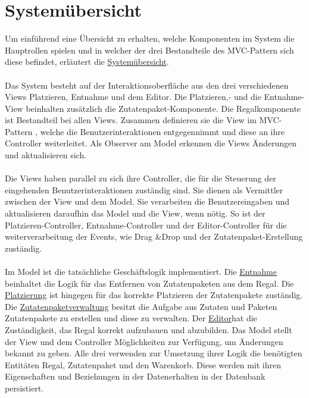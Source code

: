\section{Systemübersicht}
Um einführend eine Übersicht zu erhalten, welche Komponenten im System die Hauptrollen spielen und in welcher der
drei Bestandteile des MVC-Pattern sich diese befindet, erläutert die \hyperref[fig:Systemuebersicht]{Systemübersicht}.
\\\\
Das System besteht auf der Interaktionsoberfläche aus den drei verschiedenen Views Platzieren, Entnahme
und dem Editor. Die Platzieren,- und die Entnahme-View beinhalten zusätzlich die Zutatenpaket-Komponente. Die
Regalkomponente ist Bestandteil bei allen Views. Zusammen definieren sie die View im MVC-Pattern , welche die
Benutzerinteraktionen entgegennimmt und diese an ihre Controller weiterleitet. Als Observer am Model
erkennen die Views Änderungen und aktualisieren sich.
\\\\
Die Views haben parallel zu sich ihre Controller, die für die Steuerung der eingehenden Benutzerinteraktionen
zuständig sind. Sie dienen als Vermittler zwischen der View und dem Model. Sie verarbeiten die Benutzereingaben und
aktualisieren daraufhin das Model und die View, wenn nötig.
So ist der Platzieren-Controller, Entnahme-Controller und der Editor-Controller für die weiterverarbeitung
der Events, wie Drag \&Drop und der Zutatenpaket-Erstellung zuständig.
\\\\
Im Model ist die tatsächliche Geschäftslogik implementiert. Die \hyperref[subsec:entnahme]{Entnahme} beinhaltet die
Logik für das Entfernen von Zutatenpaketen aus dem Regal. Die \hyperref[subsec:platzierung]{Platzierung} ist
hingegen für das korrekte Platzieren der Zutatenpakete zuständig. Die
\hyperref[subsec:zutatenpaketverwaltung]{Zutatenpaketverwaltung} besitzt die Aufgabe aus Zutaten und Paketen
Zutatenpakete zu erstellen und diese zu verwalten. Der \hyperref[subsec:editor]{Editor}hat die Zuständigkeit, das
Regal korrekt aufzubauen und abzubilden. Das Model stellt der View und dem Controller Möglichkeiten zur Verfügung,
um Änderungen bekannt zu geben. Alle drei verwenden zur Umsetzung ihrer Logik die benötigten Entitäten Regal,
Zutatenpaket und den Warenkorb. Diese werden mit ihren Eigenschaften und Beziehungen in der Datenerhalten in der
Datenbank persistiert.

